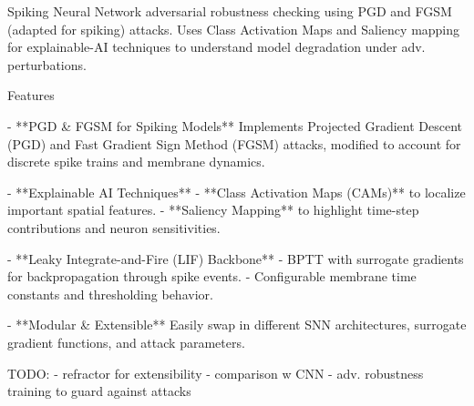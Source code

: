 Spiking Neural Network adversarial robustness checking using PGD and FGSM (adapted for spiking) attacks. Uses Class Activation Maps and Saliency mapping
for explainable-AI techniques to understand model degradation under adv. perturbations.


Features

- **PGD & FGSM for Spiking Models**  
  Implements Projected Gradient Descent (PGD) and Fast Gradient Sign Method (FGSM) attacks, modified to account for discrete spike trains and membrane dynamics.

- **Explainable AI Techniques**  
  - **Class Activation Maps (CAMs)** to localize important spatial features.  
  - **Saliency Mapping** to highlight time-step contributions and neuron sensitivities.

- **Leaky Integrate-and-Fire (LIF) Backbone**  
  - BPTT with surrogate gradients for backpropagation through spike events.  
  - Configurable membrane time constants and thresholding behavior.

- **Modular & Extensible**  
  Easily swap in different SNN architectures, surrogate gradient functions, and attack parameters.

TODO:
- refractor for extensibility
- comparison w CNN
- adv. robustness training to guard against attacks
